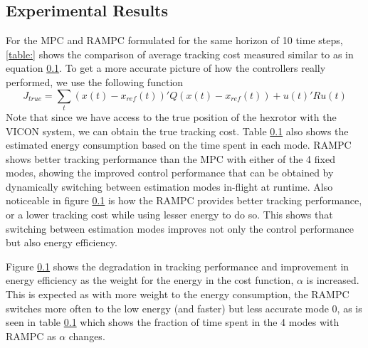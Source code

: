 \subsection{Experimental Results}

For the MPC and RAMPC formulated for the same horizon of 10 time steps, \ref{table:} shows the comparison of average tracking cost measured similar to as in equation \ref{}. To get a more accurate picture of how the controllers really performed, we use the following function 
\begin{equation}
J_{true} = \sum_t (x(t)-x_{ref}(t))'Q(x(t)-x_{ref}(t)) + u(t)'Ru(t)
\end{equation}
Note that since we have access to the true position of the hexrotor with the VICON system, we can obtain the true tracking cost. Table \ref{} also shows the estimated energy consumption based on the time spent in each mode. RAMPC shows better tracking performance than the MPC with either of the 4 fixed modes, showing the improved control performance that can be obtained by dynamically switching between estimation modes in-flight at runtime. Also noticeable in figure \ref{} is how the RAMPC provides better tracking performance, or a lower tracking cost while using lesser energy to do so. This shows that switching between estimation modes improves not only the control performance but also energy efficiency. 

Figure \ref{} shows the degradation in tracking performance and improvement in energy efficiency as the weight for the energy in the cost function, $\alpha$ is increased. This is expected as with more weight to the energy consumption, the RAMPC switches more often to the low energy (and faster) but less accurate mode 0, as is seen in table \ref{} which shows the fraction of time spent in the 4 modes with RAMPC as $\alpha$ changes. 